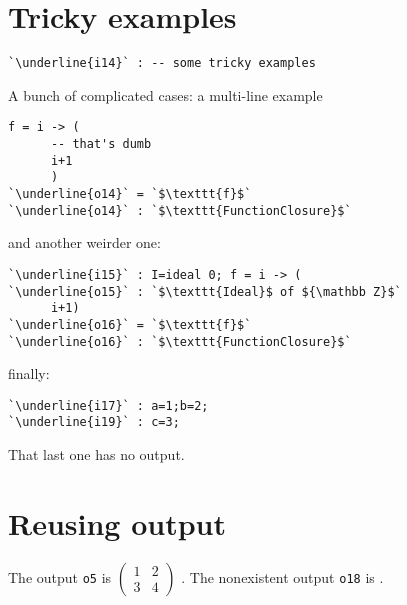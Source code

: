 \documentclass[12pt,a4paper]{amsart}
\begin{document}
\section{Tricky examples}
\begin{lstlisting}[language=Macaulay2]
`\underline{i14}` : -- some tricky examples\end{lstlisting}
A bunch of complicated cases: a multi-line example
\begin{lstlisting}[language=Macaulay2]
      f = i -> (
      -- that's dumb
      i+1
      )
`\underline{o14}` = `$\texttt{f}$`
`\underline{o14}` : `$\texttt{FunctionClosure}$`\end{lstlisting}
and another weirder one:
\begin{lstlisting}[language=Macaulay2]
`\underline{i15}` : I=ideal 0; f = i -> (
`\underline{o15}` : `$\texttt{Ideal}$ of ${\mathbb Z}$`
      i+1)
`\underline{o16}` = `$\texttt{f}$`
`\underline{o16}` : `$\texttt{FunctionClosure}$`\end{lstlisting}
finally:
\begin{lstlisting}[language=Macaulay2]
`\underline{i17}` : a=1;b=2;
`\underline{i19}` : c=3;\end{lstlisting}
That last one has no output.

\section{Reusing output}
\newcommand\macoutput[1]{{\tt [Macaulay2 output o#1]}}%
The output {\tt o5} is $\left(\!\begin{array}{cc}
1&2\\
3&4
\end{array}\!\right)$%
.
The nonexistent output {\tt o18} is %
.
\end{document}
